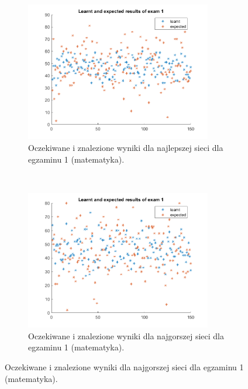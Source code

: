 \documentclass[12pt]{article}
\begin{document}
\begin{figure}[H]
\begin{subfigure}[t]{0.48\textwidth} 
\centering
\includegraphics[height=2.4in]{best_results_1.png}
\caption{Oczekiwane i znalezione wyniki dla najlepszej sieci dla egzaminu 1 (matematyka).}
\end{subfigure}
~~
\begin{subfigure}[t]{0.48\textwidth} 
\centering
\includegraphics[height=2.4in]{worst_exam_1.png}
\caption{Oczekiwane i znalezione wyniki dla najgorszej sieci dla egzaminu 1 (matematyka).}
\end{subfigure}


\end{figure}
\end{document}
